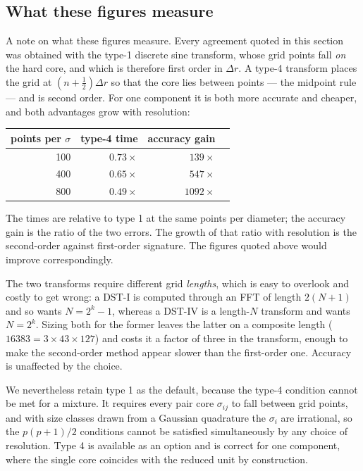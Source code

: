 \subsection{What these figures measure}

A note on what these figures measure. Every agreement quoted in this section
was obtained with the type-1 discrete sine transform, whose grid points fall
\emph{on} the hard core, and which is therefore first order in $\Delta r$. A
type-4 transform places the grid at $(n+\tfrac12)\Delta r$ so that the core
lies between points --- the midpoint rule --- and is second order. For one
component it is both more accurate and cheaper, and both advantages grow with
resolution:

\begin{center}\small
\begin{tabular}{rrrr}
\toprule
points per $\sigma$ & type-4 time & accuracy gain\\
\midrule
100 & $0.73\times$ & $139\times$\\
400 & $0.65\times$ & $547\times$\\
800 & $0.49\times$ & $1092\times$\\
\bottomrule
\end{tabular}
\end{center}

The times are relative to type 1 at the same points per diameter; the
accuracy gain is the ratio of the two errors. The growth of that ratio with
resolution is the second-order against first-order signature. The figures
quoted above would improve correspondingly.

The two transforms require different grid \emph{lengths}, which is easy to
overlook and costly to get wrong: a DST-I is computed through an FFT of
length $2(N+1)$ and so wants $N = 2^{k}-1$, whereas a DST-IV is a length-$N$
transform and wants $N = 2^{k}$. Sizing both for the former leaves the latter
on a composite length ($16383 = 3\times43\times127$) and costs it a factor of
three in the transform, enough to make the second-order method appear slower
than the first-order one. Accuracy is unaffected by the choice.

We nevertheless retain type 1 as the default, because the type-4 condition
cannot be met for a mixture. It requires every pair core $\sigma_{ij}$ to
fall between grid points, and with size classes drawn from a Gaussian
quadrature the $\sigma_i$ are irrational, so the $p(p+1)/2$ conditions cannot
be satisfied simultaneously by any choice of resolution. Type 4 is available
as an option and is correct for one component, where the single core
coincides with the reduced unit by construction.


